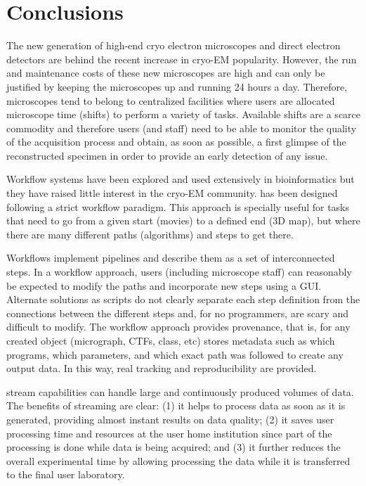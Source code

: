 
\section{Conclusions}

The new generation of high-end cryo electron microscopes and direct electron detectors are behind the recent increase in cryo-EM  popularity. However, the run and maintenance costs of these new microscopes are high and can only be justified by keeping the microscopes up and running 24 hours a day. Therefore, microscopes tend to belong to centralized facilities where users are allocated microscope time (shifts) to perform a variety of tasks. Available shifts are a scarce commodity and therefore users (and staff) need to be able to monitor the quality of the acquisition process and obtain, as soon as possible, a first glimpse of the reconstructed specimen in order to provide an early detection of any issue. 

 Workflow systems have been explored and used extensively in bioinformatics but they have raised little interest in the cryo-EM community. \scipion has been designed following a strict workflow paradigm. This approach is specially useful for tasks that need to go from a given start (movies) to a defined end (3D map), but where there are many different paths (algorithms) and steps to get there.
 
 Workflows implement pipelines and describe them as a set of interconnected steps. In a workflow approach, users (including microscope staff) can reasonably be expected to modify the paths and incorporate new steps using a GUI. Alternate solutions as scripts do not clearly separate each step definition from the connections between the different steps and, for no programmers, are scary and difficult to modify. The \scipion workflow approach provides provenance, that is,  for any created object (micrograph, CTFs, class, etc) \scipion stores metadata such as which programs, which parameters, and which exact path was followed to create any output data.  In this way,  real tracking and reproducibility are provided. 

 \scipion stream capabilities can handle large and continuously produced volumes of data. The benefits of streaming are clear: (1) it helps to process data as soon as it is generated,  providing almost instant results on data quality; (2) it saves user processing time and resources at the user home institution since part of the processing is done while data is being acquired; and (3) 
 it further reduces the overall experimental time by allowing processing the data while it is transferred to the final user laboratory. 
 
